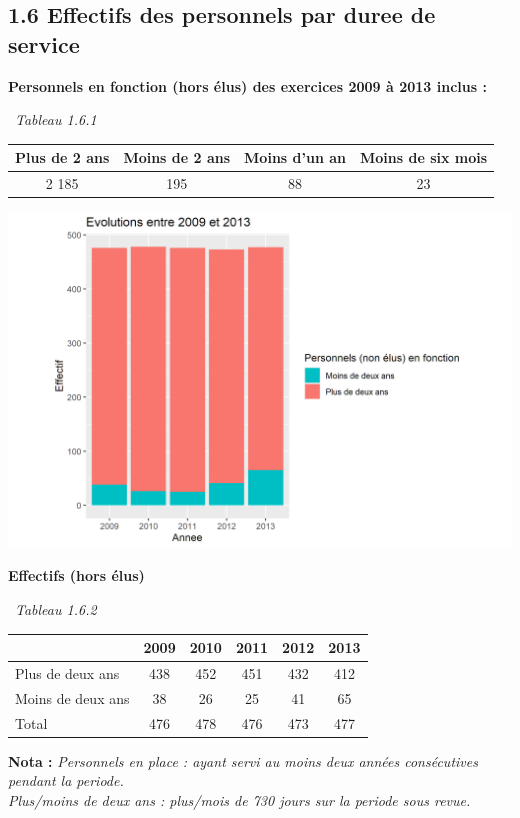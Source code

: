 \hypertarget{effectifs-des-personnels-par-duree-de-service}{%
\subsection{1.6 Effectifs des personnels par duree de
service}\label{effectifs-des-personnels-par-duree-de-service}}

\textbf{Personnels en fonction (hors élus) des exercices 2009 à 2013
inclus :}

~\emph{Tableau 1.6.1}

\begin{longtable}[]{@{}cccc@{}}
\toprule
Plus de 2 ans & Moins de 2 ans & Moins d'un an & Moins de six
mois\tabularnewline
\midrule
\endhead
2 185 & 195 & 88 & 23\tabularnewline
\bottomrule
\end{longtable}

\includegraphics{altair_files/figure-latex/unnamed-chunk-35-1.png}

\textbf{Effectifs (hors élus)}

~\emph{Tableau 1.6.2}

\begin{longtable}[]{@{}lccccc@{}}
\toprule
& 2009 & 2010 & 2011 & 2012 & 2013\tabularnewline
\midrule
\endhead
Plus de deux ans & 438 & 452 & 451 & 432 & 412\tabularnewline
Moins de deux ans & 38 & 26 & 25 & 41 & 65\tabularnewline
Total & 476 & 478 & 476 & 473 & 477\tabularnewline
\bottomrule
\end{longtable}

\textbf{Nota :} \emph{Personnels en place : ayant servi au moins deux
années consécutives pendant la periode.}\\
\emph{Plus/moins de deux ans : plus/mois de 730 jours sur la periode
sous revue.}

